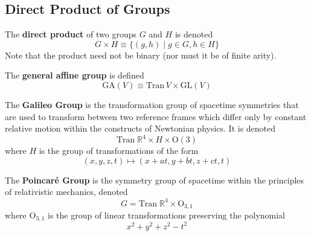 \documentclass{article}
\begin{document}
  \subsection{Direct Product of Groups}

    \begin{definition}
      The \textbf{direct product} of two groups $G$ and $H$ is denoted
      \begin{equation}
        G \times H \equiv \{ (g, h)\;|\; g \in G, h \in H \}
      \end{equation}
      Note that the product need not be binary (nor must it be of finite arity). 
    \end{definition}

    \begin{definition}
      The \textbf{general affine group} is defined 
      \begin{equation}
        \text{GA}(V) \equiv \text{Tran}\,V \times \text{GL}(V)
      \end{equation}
    \end{definition}

    \begin{definition}
      The \textbf{Galileo Group} is the transformation group of spacetime symmetries that are used to transform between two reference frames which differ only by constant relative motion within the constructs of Newtonian physics. It is denoted 
      \begin{equation}
        \text{Tran}\;\mathbb{R}^{4} \times H \times \text{O} (3)
      \end{equation}
      where $H$ is the group of transformations of the form 
      \begin{equation}
        (x, y, z, t) \longmapsto (x+at, y+bt, z+ct, t)
      \end{equation}
    \end{definition}

    \begin{definition}
      The \textbf{Poincaré Group} is the symmetry group of spacetime within the principles of relativistic mechanics, denoted
      \begin{equation}
        G = \text{Tran}\; \mathbb{R}^{4} \times \text{O}_{3,1}
      \end{equation}
      where O$_{3,1}$ is the group of linear transformations preserving the polynomial 
      \begin{equation}
        x^{2} + y^{2} + z^{2} - t^{2}
      \end{equation}
    \end{definition}
\end{document}

